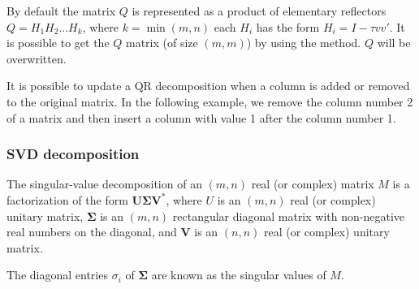 \documentclass[a4paper,10pt]{article}
\begin{document}
\begin{minipage}[t]{0.60\textwidth}

\end{minipage}
\hspace{0.2cm}
\begin{minipage}[t]{0.39\textwidth}
\addtocounter{lstlisting}{-1}

\end{minipage}

\begin{note}
By default the matrix $Q$ is represented as a product of elementary reflectors
$ Q = H_1 H_2 . . . H_k$, where $k = \min(m,n)$
each $H_i$ has the form $H_i = I - \tau vv'$.
It is possible to get the $Q$ matrix (of size $(m,m)$) by using the
 method. $Q$ will be overwritten.
\end{note}

It is possible to update a QR decomposition when a column is added or removed to the original
matrix. In the following example, we remove the column number 2 of a matrix and
then insert a column with value 1 after the column number 1.

\begin{minipage}[t]{0.60\textwidth}

\end{minipage}
\hspace{0.2cm}
\begin{minipage}[t]{0.39\textwidth}
\addtocounter{lstlisting}{-1}

\end{minipage}

\subsubsection{SVD decomposition}

The singular-value decomposition of an $(m,n)$ real (or complex) matrix
$M$ is a factorization of the form $ \mathbf{U\Sigma V^*}$, where
$U$ is an $(m,n)$ real (or complex) unitary matrix,
$\mathbf{\Sigma}$ is an $(m,n)$ rectangular diagonal matrix with non-negative
real numbers on the diagonal, and $\mathbf{V}$ is an $(n,n)$ real
(or complex) unitary matrix.

The diagonal entries $\sigma_i$ of $\mathbf{\Sigma}$ are known as the
singular values of $M$.

\begin{minipage}[t]{0.66\textwidth}

\end{minipage}
\hspace{0.2cm}
\begin{minipage}[t]{0.33\textwidth}
\addtocounter{lstlisting}{-1}

\end{minipage}
\end{document}
